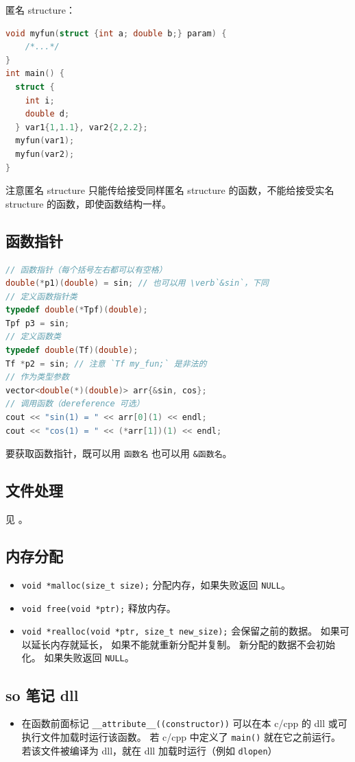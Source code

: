 匿名 structure：
\begin{lstlisting}[language=cpp]
void myfun(struct {int a; double b;} param) {
    /*...*/
}
int main() {
  struct {
    int i;
    double d;
  } var1{1,1.1}, var2{2,2.2};
  myfun(var1);
  myfun(var2);
}
\end{lstlisting}
注意匿名 structure 只能传给接受同样匿名 structure 的函数，不能给接受实名 structure 的函数，即使函数结构一样。

\subsection{函数指针}
\begin{lstlisting}[language=cpp]
// 函数指针（每个括号左右都可以有空格）
double(*p1)(double) = sin; // 也可以用 \verb`&sin`，下同
// 定义函数指针类
typedef double(*Tpf)(double);
Tpf p3 = sin;
// 定义函数类
typedef double(Tf)(double);
Tf *p2 = sin; // 注意 `Tf my_fun;` 是非法的
// 作为类型参数
vector<double(*)(double)> arr{&sin, cos};
// 调用函数（dereference 可选）
cout << "sin(1) = " << arr[0](1) << endl;
cout << "cos(1) = " << (*arr[1])(1) << endl;
\end{lstlisting}

要获取函数指针，既可以用 \verb`函数名` 也可以用 \verb`&函数名`。

\subsection{文件处理}
见 。


\subsection{内存分配}
\begin{itemize}
\item \verb`void *malloc(size_t size);` 分配内存，如果失败返回 \verb`NULL`。
\item \verb`void free(void *ptr);` 释放内存。
\item \verb`void *realloc(void *ptr, size_t new_size);` 会保留之前的数据。 如果可以延长内存就延长， 如果不能就重新分配并复制。 新分配的数据不会初始化。 如果失败返回 \verb`NULL`。
\end{itemize}

\subsection{so 笔记 dll}
\begin{itemize}
\item 在函数前面标记 \verb`__attribute__((constructor))` 可以在本 c/cpp 的 dll 或可执行文件加载时运行该函数。 若 c/cpp 中定义了 \verb`main()` 就在它之前运行。 若该文件被编译为 dll，就在 dll 加载时运行（例如 \verb`dlopen`）
\end{itemize}

